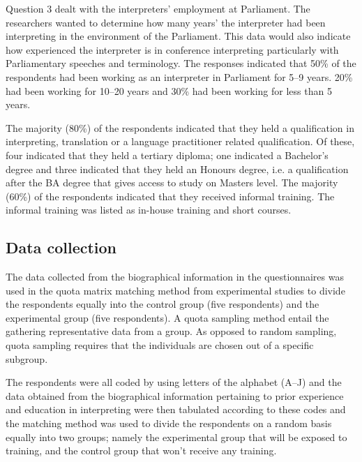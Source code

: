 \documentclass[output=paper]{langsci/langscibook}
\begin{document}
Question 3 dealt with the interpreters’ employment at Parliament. The researchers wanted to determine how many years’ the interpreter had been interpreting in the environment of the Parliament. This data would also indicate how experienced the interpreter is in conference interpreting particularly with Parliamentary speeches and terminology. The responses indicated that 50\% of the respondents had been working as an interpreter in Parliament for 5--9 years. 20\% had been working for 10--20 years and 30\% had been working for less than 5 years. 

The majority (80\%) of the respondents indicated that they held a qualification in interpreting, translation or a language practitioner related qualification. Of these, four indicated that they held a tertiary diploma; one indicated a Bachelor’s degree and three indicated that they held an Honours degree, i.e. a qualification after the BA degree that gives access to study on Masters level. The majority (60\%) of the respondents indicated that they received informal training. The informal training was listed as in-house training and short courses.  


\subsection{Data collection}
The data collected from the biographical information in the questionnaires was used in the quota matrix matching method from experimental studies to divide the respondents equally into the control group (five respondents) and the experimental group (five respondents). A quota sampling method entail the gathering representative data from a group. As opposed to random sampling, quota sampling requires that the individuals are chosen out of a specific subgroup. 

The respondents were all coded by using letters of the alphabet (A--J) and the data obtained from the biographical information pertaining to prior experience and education in interpreting were then tabulated according to these codes and the matching method was used to divide the respondents on a random basis equally into two groups; namely the experimental group that will be exposed to training, and the control group that won’t receive any training. 
\end{document}
